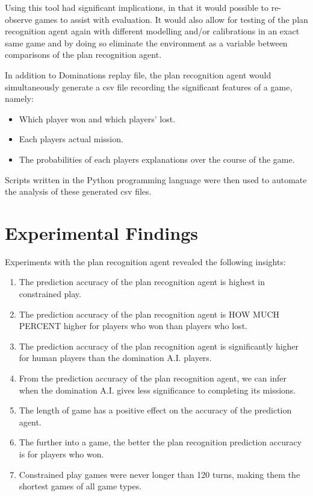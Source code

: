 \documentclass[parskip]{cs4rep}
\begin{document}
Using this tool had significant implications, in that it would possible to re-observe games to assist with evaluation. It would also allow for testing of the plan recognition agent again with different modelling and/or calibrations in an exact same game and by doing so eliminate the environment as a variable between comparisons of the plan recognition agent.

In addition to Dominations replay file, the plan recognition agent would simultaneously generate a csv file recording the significant features of a game, namely:

\begin{itemize}
\item
Which player won and which players' lost.
\item
Each players actual mission.
\item
The probabilities of each players explanations over the course of the game.
\end{itemize}

Scripts written in the Python programming language were then used to automate the analysis of these generated csv files.

\newpage

\section{Experimental Findings}

Experiments with the plan recognition agent revealed the following insights:

\begin{enumerate}
\item
The prediction accuracy of the plan recognition agent is highest in constrained play. 
\item
The prediction accuracy of the plan recognition agent is HOW MUCH PERCENT higher for players who won than players who lost.
\item
The prediction accuracy of the plan recognition agent is significantly higher for human players than the domination A.I. players.
\item
From the prediction accuracy of the plan recognition agent, we can infer when the domination A.I. gives less significance to completing its missions.
\item
The length of game has a positive effect on the accuracy of the prediction agent.
\item
The further into a game, the better the plan recognition prediction accuracy is for players who won.
\item
Constrained play games were never longer than 120 turns, making them the shortest games of all game types.
\end{enumerate}
\end{document}
